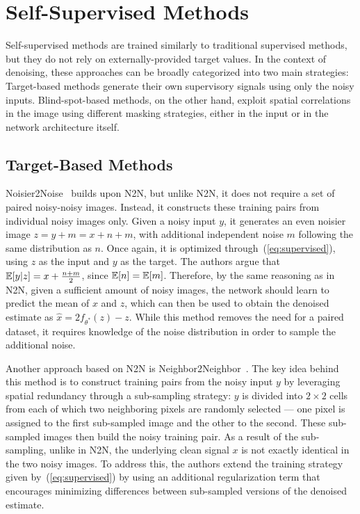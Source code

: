 \section{Self-Supervised Methods}

Self-supervised methods are trained similarly to traditional supervised methods, but they do not rely on externally-provided target values.
In the context of denoising, these approaches can be broadly categorized into two main strategies:
Target-based methods generate their own supervisory signals using only the noisy inputs.
Blind-spot-based methods, on the other hand, exploit spatial correlations in the image using different masking strategies, either in the input or in the network architecture itself.

\subsection{Target-Based Methods}

Noisier2Noise~\cite{Noisier2Noise} builds upon N2N, but unlike N2N, it does not require a set of paired noisy-noisy images.
Instead, it constructs these training pairs from individual noisy images only.
Given a noisy input $y$, it generates an even noisier image $z = y + m = x + n + m$, with additional independent noise $m$ following the same distribution as $n$.
Once again, it is optimized through~(\ref{eq:supervised}), using $z$ as the input and $y$ as the target.
The authors argue that $\mathbb{E} [y|z] = x + \frac{n + m}{2}$, since $\mathbb{E} [n] = \mathbb{E} [m]$.
Therefore, by the same reasoning as in N2N, given a sufficient amount of noisy images, the network should learn to predict the mean of $x$ and $z$, which can then be used to obtain the denoised estimate as $\hat{x} = 2f_{\theta^*}(z) - z$.
While this method removes the need for a paired dataset, it requires knowledge of the noise distribution in order to sample the additional noise.

Another approach based on N2N is Neighbor2Neighbor~\cite{Neighbor2Neighbor}.
The key idea behind this method is to construct training pairs from the noisy input $y$ by leveraging spatial redundancy through a sub-sampling strategy:
$y$ is divided into $2 \times 2$ cells from each of which two neighboring pixels are randomly selected --- one pixel is assigned to the first sub-sampled image and the other to the second.
These sub-sampled images then build the noisy training pair.
As a result of the sub-sampling, unlike in N2N, the underlying clean signal $x$ is not exactly identical in the two noisy images.
To address this, the authors extend the training strategy given by~(\ref{eq:supervised}) by using an additional regularization term that encourages minimizing differences between sub-sampled versions of the denoised estimate.

